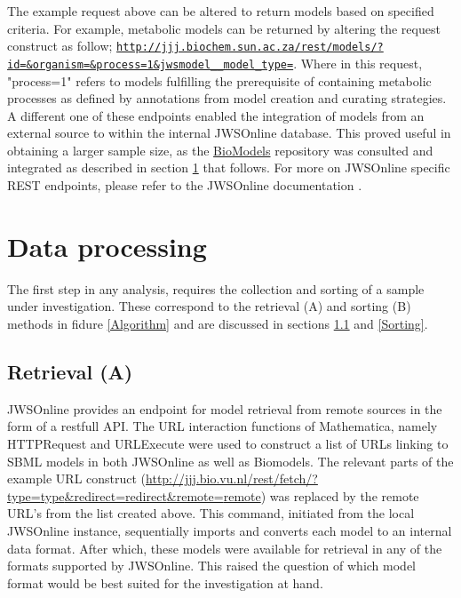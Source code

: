The example request above can be altered to return models based on specified criteria. For example, metabolic models can be returned by altering the request construct as follow; \href{http://jjj.biochem.sun.ac.za/rest/models/?id=&organism=&process=1&jwsmodel__model_type=}{\nolinkurl{http://jjj.biochem.sun.ac.za/rest/models/?id=\&organism=\&process=1\&jwsmodel\_\_model\_type=}}. Where in this request, "process=1" refers to models fulfilling the prerequisite of containing metabolic processes as defined by annotations from model creation and curating strategies. A different one of these endpoints enabled the integration of models from an external source to within the internal JWSOnline database. This proved useful in obtaining a larger sample size, as the \href{https://www.ebi.ac.uk/biomodels-main/}{BioModels} repository was consulted and integrated as described in section \ref{Data processing} that follows. For more on JWSOnline specific REST endpoints, please refer to the JWSOnline documentation \cite{jwsdocs}. 

\section{Data processing} \label{Data processing}
The first step in any analysis, requires the collection and sorting of a sample under investigation. These correspond to the retrieval (A) and sorting (B) methods in fidure \ref{Algorithm} and are discussed in sections \ref{Retrieval} and \ref{Sorting}. 

\subsection{Retrieval (A)} \label{Retrieval}
JWSOnline provides an endpoint for model retrieval from remote sources in the form of a restfull API. The URL interaction functions of Mathematica, namely HTTPRequest and URLExecute were used to construct a list of URLs linking to SBML models in both JWSOnline as well as Biomodels. The relevant parts of the example URL construct (\href{http://jjj.bio.vu.nl/rest/fetch/?type={type}&redirect={redirect}&remote={remote}}{http://jjj.bio.vu.nl/rest/fetch/?type={type}&redirect={redirect}&remote={remote}}) was replaced by the remote URL's from the list created above. This command, initiated from the local JWSOnline instance, sequentially imports and converts each model to an internal data format. After which, these models were available for retrieval in any of the formats supported by JWSOnline. This raised the question of which model format would be best suited for the investigation at hand.

